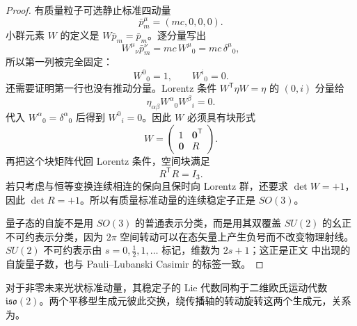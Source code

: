 \begin{proof}
有质量粒子可选静止标准四动量
\begin{equation*}
 \bar p_m^\mu=(mc,0,0,0).
\end{equation*}
小群元素 $W$ 的定义是 $W\bar p_m=\bar p_m$。逐分量写出
\begin{equation*}
 W^\mu{}_{\nu}\bar p_m^\nu
 =mc\,W^\mu{}_0
 =mc\,\delta^\mu{}_0,
\end{equation*}
所以第一列被完全固定：
\begin{equation*}
 W^0{}_0=1,
 \qquad
 W^i{}_0=0.
\end{equation*}
还需要证明第一行也没有推动分量。Lorentz 条件
$W^{\mathsf T}\eta W=\eta$ 的 $(0,i)$ 分量给
\begin{equation*}
 \eta_{\alpha\beta}W^\alpha{}_0W^\beta{}_i=0.
\end{equation*}
代入 $W^\alpha{}_0=\delta^\alpha{}_0$ 后得到
$W^0{}_i=0$。因此 $W$ 必须具有块形式
\begin{equation*}
 W=
 \begin{pmatrix}
 1&\mathbf0^{\mathsf T}\\
 \mathbf0&R
 \end{pmatrix}.
\end{equation*}
再把这个块矩阵代回 Lorentz 条件，空间块满足
\begin{equation*}
 R^{\mathsf T}R=I_3.
\end{equation*}
若只考虑与恒等变换连续相连的保向且保时向 Lorentz 群，还要求
$\det W=+1$，因此 $\det R=+1$。所以有质量标准动量的连续稳定子正是
$SO(3)$。

量子态的自旋不是用 $SO(3)$ 的普通表示分类，而是用其双覆盖 $SU(2)$ 的幺正不可约表示分类，因为 $2\pi$ 空间转动可以在态矢量上产生负号而不改变物理射线。$SU(2)$ 不可约表示由
$s=0,\tfrac12,1,\ldots$ 标记，维数为 $2s+1$；这正是正文 中出现的自旋量子数，也与 Pauli--Lubanski Casimir 的标签一致。
\end{proof}

\begin{theorem}
对于非零未来光状标准动量，其稳定子的 Lie 代数同构于二维欧氏运动代数 $\mathfrak{iso}(2)$。两个平移型生成元彼此交换，绕传播轴的转动旋转这两个生成元，关系为。
\end{theorem}

